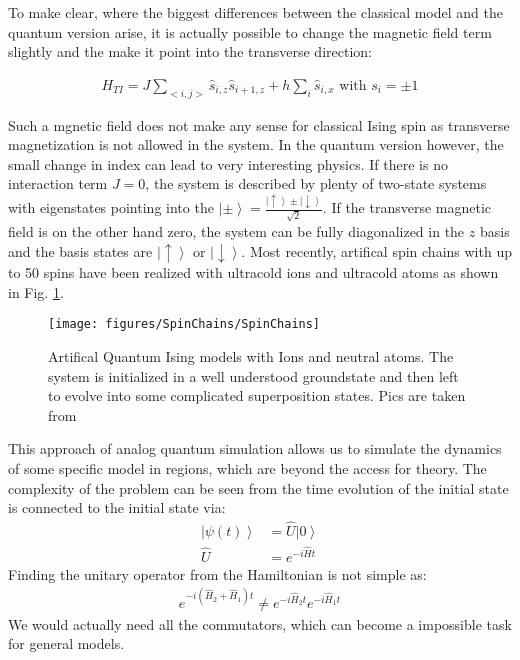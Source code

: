 \documentclass[10pt]{article}
\let\cite\citep
\providecommand\citep{\cite}
\newcommand{\ket}[1]{\ensuremath{\left|#1\right\rangle}}
\begin{document}
To make clear, where the biggest differences between the classical model and the quantum version arise, it is actually possible to change the magnetic field term slightly and the make it point into the transverse direction:

\begin{align}\label{Eq:ClassicalIsing}
H_{TI} = J \sum_{<i,j>} \hat{s}_{i,z} \hat{s}_{i+1, z}+h \sum_i \hat{s}_{i,x} \text{ with }s_i = \pm 1
\end{align}

Such a mgnetic field does not make any sense for classical Ising spin as transverse magnetization is not allowed in the system. In the quantum version however, the small change in index can lead to very interesting physics. If there is no interaction term $J=0$, the system is described by plenty of two-state systems with eigenstates pointing into the $\ket{\pm} = \frac{\ket{\uparrow}\pm\ket{\downarrow}}{\sqrt{2}}$. If the transverse magnetic field is on the other hand zero, the system can be fully diagonalized in the $z$ basis and the basis states are $\ket{\uparrow}$ or $\ket{\downarrow}$. Most recently, artifical spin chains with up to 50 spins have been realized with ultracold ions and ultracold atoms as shown in Fig. \ref{920878}.
\begin{figure}[h!]
\begin{center}
\texttt{[image: figures/SpinChains/SpinChains]}
\caption{{Artifical Quantum Ising models with Ions and neutral atoms. The system
is initialized in a well understood groundstate and then left to evolve
into some complicated superposition states. Pics are taken from
\protect\cite{Islam_2013}\protect\cite{Zhang_2017}\protect\cite{Bernien_2017}
{\label{920878}}%
}}
\end{center}
\end{figure}



This approach of analog quantum simulation allows us to simulate the dynamics of some specific model in regions, which are beyond the access for theory.  The complexity of the problem can be seen from the time evolution of the initial state is connected to the initial state via:
\begin{align}
\ket{\psi(t)} &= \hat{U}\ket{0}\\
\hat{U} &= e^{-i\hat{H}t}
\end{align}
Finding the unitary operator from the Hamiltonian is not simple as:
\begin{align}
e^{-i(\hat{H}_2 +\hat{H}_1)t}\neq e^{-i\hat{H}_2 t}e^{-i\hat{H}_1 t}
\end{align}
We would actually need all the commutators, which can become a impossible task for general models.
\end{document}
